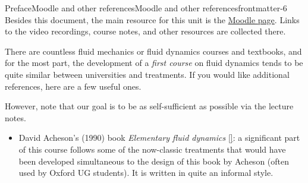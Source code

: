 \documentclass[oneside,10pt,]{book}
\newcommand{\xreffont}{\relax}
\numberwithin{equation}{section}
\begin{document}
%
%
\typeout{************************************************}
\typeout{************************************************}
%
\begin{preface}{Preface}{Moodle and other references}{}{Moodle and other references}{}{}{frontmatter-6}
Besides this document, the main resource for this unit is the \href{https://moodle.bath.ac.uk/course/view.php?id=62758}{Moodle page}. Links to the video recordings, course notes, and other resources are collected there.%
\par
There are countless fluid mechanics or fluid dynamics courses and textbooks, and for the most part, the development of a \emph{first course} on fluid dynamics tends to be quite similar between universities and treatments. If you would like additional references, here are a few useful ones.%
\par
However, note that our goal is to be as self-sufficient as possible via the lecture notes.%
\par
%
\begin{itemize}[label=\textbullet]
\item{}David Acheson's (1990) book \emph{Elementary fluid dynamics} \hyperlink{ref-acheson}{[{\xreffont 4}]}: a significant part of this course follows some of the now-classic treatments that would have been developed simultaneous to the design of this book by Acheson (often used by Oxford UG students). It is written in quite an informal style.%
\par
\begin{image}{0.35}{0.3}{0.35}{}%

\end{image}
\end{itemize}
\end{preface}
\end{document}
